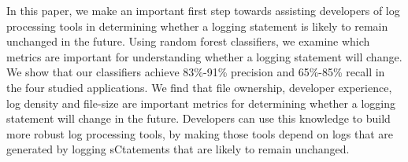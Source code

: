 In this paper, we make an important first step towards assisting developers of log processing tools in determining whether a logging statement is likely to remain unchanged in the future. Using random forest classifiers, we examine which metrics are important for understanding whether a logging statement will change. 
We show that our classifiers achieve 83\%-91\% precision and 65\%-85\% recall in the four studied applications. We find that file ownership, developer experience, log density and file-size are important metrics for determining whether a logging statement will change in the future. Developers can use this knowledge to build more robust log processing tools, by making those tools depend on logs that are generated by logging sCtatements that are likely to remain unchanged.








